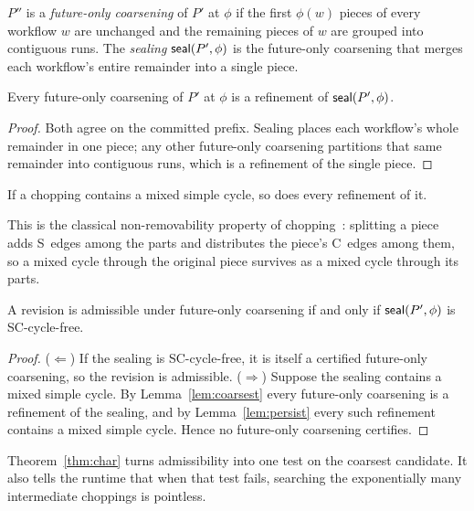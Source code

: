 \begin{definition}
$P''$ is a \emph{future-only coarsening} of $P'$ at $\phi$ if the first
$\phi(w)$ pieces of every workflow $w$ are unchanged and the remaining pieces
of $w$ are grouped into contiguous runs. The \emph{sealing}
$\mathsf{seal}(P',\phi)$ is the future-only coarsening that merges each workflow's
entire remainder into a single piece.
\end{definition}

\begin{lemma}
\label{lem:coarsest}
Every future-only coarsening of $P'$ at $\phi$ is a refinement of
$\mathsf{seal}(P',\phi)$.
\end{lemma}

\begin{proof}
Both agree on the committed prefix. Sealing places each workflow's whole
remainder in one piece; any other future-only coarsening partitions that same
remainder into contiguous runs, which is a refinement of the single piece.
\end{proof}

\begin{lemma}
\label{lem:persist}
If a chopping contains a mixed simple cycle, so does every refinement of it.
\end{lemma}

This is the classical non-removability property of
chopping~\cite{shasha1995chopping}: splitting a piece adds S~edges among the
parts and distributes the piece's C~edges among them, so a mixed cycle through
the original piece survives as a mixed cycle through its parts.

\begin{theorem}
\label{thm:char}
A revision is admissible under future-only coarsening if and only if
$\mathsf{seal}(P',\phi)$ is SC-cycle-free.
\end{theorem}

\begin{proof}
($\Leftarrow$) If the sealing is SC-cycle-free, it is itself a certified
future-only coarsening, so the revision is admissible.
($\Rightarrow$) Suppose the sealing contains a mixed simple cycle. By
Lemma~\ref{lem:coarsest} every future-only coarsening is a refinement of the
sealing, and by Lemma~\ref{lem:persist} every such refinement contains a mixed
simple cycle. Hence no future-only coarsening certifies.
\end{proof}

Theorem~\ref{thm:char} turns admissibility into one test on the coarsest
candidate. It also tells the runtime that when that test fails, searching the
exponentially many intermediate choppings is pointless.

